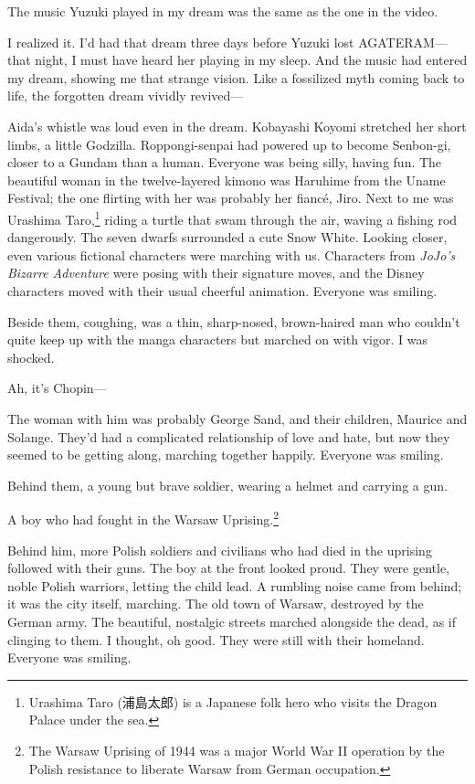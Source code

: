\documentclass[
    a4paper,
    12pt,
    twoside,
    openany,
    UTF8,
    fontset=windows
]{ctexbook}
\begin{document}
The music Yuzuki played in my dream was the same as the one in the video.

I realized it. I'd had that dream three days before Yuzuki lost AGATERAM---that night, I must have heard her playing in my sleep. And the music had entered my dream, showing me that strange vision. Like a fossilized myth coming back to life, the forgotten dream vividly revived---

Aida's whistle was loud even in the dream. Kobayashi Koyomi stretched her short limbs, a little Godzilla. Roppongi-senpai had powered up to become Senbon-gi, closer to a Gundam than a human. Everyone was being silly, having fun. The beautiful woman in the twelve-layered kimono was Haruhime from the Uname Festival; the one flirting with her was probably her fiancé, Jiro. Next to me was Urashima Taro,\footnote{Urashima Taro (浦島太郎) is a Japanese folk hero who visits the Dragon Palace under the sea.} riding a turtle that swam through the air, waving a fishing rod dangerously. The seven dwarfs surrounded a cute Snow White. Looking closer, even various fictional characters were marching with us. Characters from \textit{JoJo's Bizarre Adventure} were posing with their signature moves, and the Disney characters moved with their usual cheerful animation. Everyone was smiling.

Beside them, coughing, was a thin, sharp-nosed, brown-haired man who couldn't quite keep up with the manga characters but marched on with vigor. I was shocked.

Ah, it's Chopin---

The woman with him was probably George Sand, and their children, Maurice and Solange. They'd had a complicated relationship of love and hate, but now they seemed to be getting along, marching together happily. Everyone was smiling.

Behind them, a young but brave soldier, wearing a helmet and carrying a gun.

A boy who had fought in the Warsaw Uprising.\footnote{The Warsaw Uprising of 1944 was a major World War II operation by the Polish resistance to liberate Warsaw from German occupation.}

Behind him, more Polish soldiers and civilians who had died in the uprising followed with their guns. The boy at the front looked proud. They were gentle, noble Polish warriors, letting the child lead. A rumbling noise came from behind; it was the city itself, marching. The old town of Warsaw, destroyed by the German army. The beautiful, nostalgic streets marched alongside the dead, as if clinging to them. I thought, oh good. They were still with their homeland. Everyone was smiling.
\end{document}
